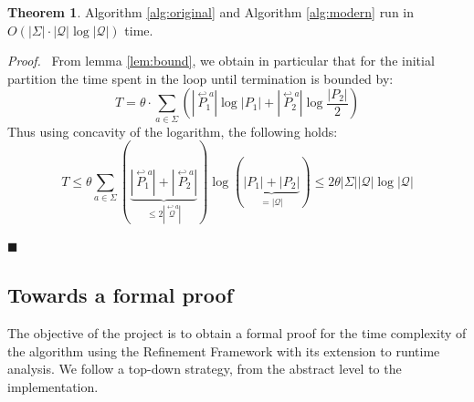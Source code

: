 \documentclass[12pt, a4 paper]{article}
\renewenvironment{proof}[1][Proof]{\begin{mdframed}[backgroundcolor=black!5, topline=false, rightline=false, bottomline=false, linecolor=black!15, linewidth=3pt]{\noindent\textit{#1.}\ }}{\noindent\par\hfill$\blacksquare$\end{mdframed}}
\theoremstyle{definition}
\newtheorem{theorem}{Theorem}
\begin{document}
\begin{theorem}
    \label{thm:complexity}
    Algorithm \ref{alg:original} and Algorithm \ref{alg:modern} run in $O\left(|\Sigma|\cdot|\mathcal{Q}| \log |\mathcal{Q}|\right)$ time.
\end{theorem}
\begin{proof}
From lemma \ref{lem:bound}, we obtain in particular that for the initial partition the time spent in the loop until termination is bounded by:
$$T = \theta \cdot \sum_{a \in \Sigma}\left(| \overset{\hookleftarrow a}{P_1} | \log | P_1 | + | \overset{\hookleftarrow a}{P_2} | \log \frac{| P_2 |}{2}\right)$$
Thus using concavity of the logarithm, the following holds:
$$T \leq \theta \sum_{a \in \Sigma} (\underset{\leq 2|\overset{\hookleftarrow a}{\mathcal{Q}}|}{\underbrace{|\overset{\hookleftarrow a}{P_1}| + |\overset{\hookleftarrow a}{P_2}|}})\log(\underset{= |\mathcal{Q}|}{\underbrace{|P_1| + |P_2|}}) \leq 2 \theta|\Sigma||\mathcal{Q}| \log |\mathcal{Q}|$$
\end{proof}

\subsection{Towards a formal proof}
The objective of the project is to obtain a formal proof for the time complexity of the algorithm using the Refinement Framework with its extension to runtime analysis.
We follow a top-down strategy, from the abstract level to the implementation.
\end{document}
